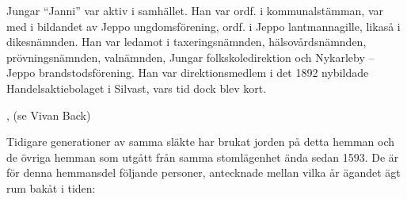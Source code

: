 Jungar ``Janni'' var aktiv i samhället. Han var ordf. i kommunalstämman, var med i bildandet av Jeppo ungdomsförening, ordf. i Jeppo lantmannagille, likaså i dikesnämnden. Han var ledamot i taxeringsnämnden, hälsovårdsnämnden, prövningsnämnden, valnämnden, Jungar folkskoledirektion och Nykarleby – Jeppo brandstodsförening. Han var direktionsmedlem i det 1892 nybildade Handelsaktiebolaget i Silvast, vars tid dock blev kort.
\begin{jhchildren}
  \item {}
  \item {}
  \item {}
  \item {}
  \item {}
  \item {}
  \item {}, (se Vivan Back)
  \item {}
  \item {}
  \item {}
  \item {}
\end{jhchildren}

Tidigare generationer av samma släkte har brukat jorden på detta hemman och de övriga hemman som utgått från samma stomlägenhet ända sedan 1593. De är för denna hemmansdel följande personer, antecknade mellan vilka år ägandet ägt rum bakåt i tiden:

